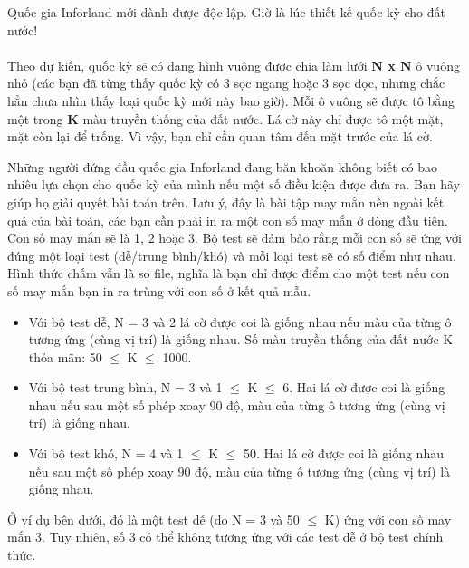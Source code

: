 Quốc gia Inforland mới dành được độc lập. Giờ là lúc thiết kế quốc kỳ cho đất nước!   
\\
\\   Theo dự kiến, quốc kỳ sẽ có dạng hình vuông được chia làm lưới   \textbf{    N x N   }   ô vuông nhỏ (các bạn đã từng thấy quốc kỳ có 3 sọc ngang hoặc 3 sọc dọc, nhưng chắc hẳn chưa nhìn thấy loại quốc kỳ mới này bao giờ). Mỗi ô vuông sẽ được tô bằng một trong   \textbf{    K   }   màu truyền thống của đất nước. Lá cờ này chỉ được tô một mặt, mặt còn lại để trống. Vì vậy, bạn chỉ cần quan tâm đến mặt trước của lá cờ.  

   Những người đứng đầu quốc gia Inforland đang băn khoăn không biết có bao nhiêu lựa chọn cho quốc kỳ của mình nếu một số điều kiện được đưa ra. Bạn hãy giúp họ giải quyết bài toán trên. Lưu ý, đây là bài tập may mắn nên ngoài kết quả của bài toán, các bạn cần phải in ra một con số may mắn ở dòng đầu tiên. Con số may mắn sẽ là 1, 2 hoặc 3. Bộ test sẽ đảm bảo rằng mỗi con số sẽ ứng với đúng một loại test (dễ/trung bình/khó) và mỗi loại test sẽ có số điểm như nhau. Hình thức chấm vẫn là so file, nghĩa là bạn chỉ được điểm cho một test nếu con số may mắn bạn in ra trùng với con số ở kết quả mẫu.  
\begin{itemize}
	\item     Với bộ test dễ, N = 3 và 2 lá cờ được coi là giống nhau nếu màu của từng ô tương ứng (cùng vị trí) là giống nhau. Số màu truyền thống của đất nước K thỏa mãn: 50  $\le$  K  $\le$  1000.   
\end{itemize}
\begin{itemize}
	\item     Với bộ test trung bình, N = 3 và 1  $\le$  K  $\le$  6. Hai lá cờ được coi là giống nhau nếu sau một số phép xoay 90 độ, màu của từng ô tương ứng (cùng vị trí) là giống nhau.   
\end{itemize}
\begin{itemize}
	\item     Với bộ test khó, N = 4 và 1  $\le$  K  $\le$  50. Hai lá cờ được coi là giống nhau nếu sau một số phép xoay 90 độ, màu của từng ô tương ứng (cùng vị trí) là giống nhau.   
\end{itemize}

   Ở ví dụ bên dưới, đó là một test dễ (do N = 3 và 50  $\le$  K) ứng với con số may mắn 3. Tuy nhiên, số 3 có thể không tương ứng với các test dễ ở bộ test chính thức.